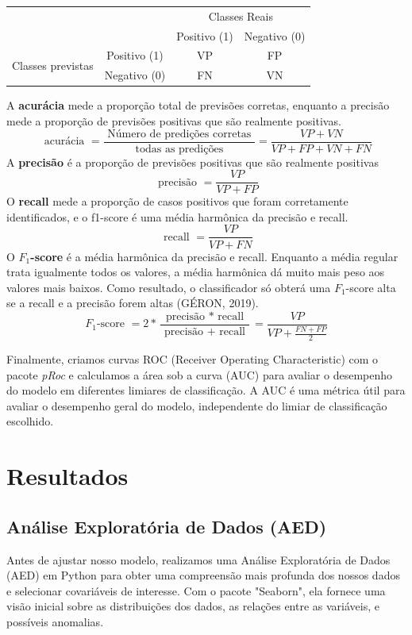 \documentclass[article,11pt,a4paper,brazil]{abntex2}
\begin{document}
	\begin{tabular}{|c|c|c|c|}
		\multicolumn{2}{c|}{} & \multicolumn{2}{c|}{Classes Reais} \\
		\multicolumn{2}{c|}{} & Positivo (1) & Negativo (0) \\
		\hline
		\multirow{2}{*}{Classes previstas} & Positivo (1) & VP & FP \\
		\cline{3-4}
		& Negativo (0) & FN & VN \\
		\hline
	\end{tabular}	
\newpage

	\noindent A \textbf{acurácia} mede a proporção total de previsões corretas, enquanto a precisão mede a proporção de previsões positivas que são realmente positivas. 	
	$$
	\text { acurácia }=\frac{\text { Número de predições corretas }}{\text { todas as predições }}=\frac{V P+V N}{V P+F P+V N+F N}
	$$	
	\noindent A \textbf{precisão} é a proporção de previsões positivas que são realmente positivas 
	$$
	\text { precisão }=\frac{V P}{V P+F P}
	$$
	O \textbf{recall} mede a proporção de casos positivos que foram corretamente identificados, e o f1-score é uma média harmônica da precisão e recall.
	$$
	\text { recall }=\frac{V P}{V P+F N}
	$$
	O \textbf{$F_1$-score} é a média harmônica da precisão e recall. Enquanto a média regular trata igualmente todos os valores, a média harmônica dá muito mais peso aos valores mais baixos. Como resultado, o classificador só obterá uma $F_1$-score alta se a recall e a precisão forem altas (GÉRON, 2019).
	$$
	F_1 \text {-score }=2 * \frac{\text { precisão } * \text { recall }}{\text { precisão } +\text { recall }}=\frac{V P}{V P+\frac{F N+F P}{2}}
	$$

	Finalmente, criamos curvas ROC (Receiver Operating Characteristic) com o pacote \textit{pRoc} e calculamos a área sob a curva (AUC) para avaliar o desempenho do modelo em diferentes limiares de classificação. A AUC é uma métrica útil para avaliar o desempenho geral do modelo, independente do limiar de classificação escolhido.
	\newpage
	\section{Resultados}
	\subsection{Análise Exploratória de Dados (AED)}
	Antes de ajustar nosso modelo, realizamos uma Análise Exploratória de Dados (AED) em Python para obter uma compreensão mais profunda dos nossos dados e selecionar covariáveis de interesse. Com o pacote "Seaborn", ela fornece uma visão inicial sobre as distribuições dos dados, as relações entre as variáveis, e possíveis anomalias.
	
\end{document}
